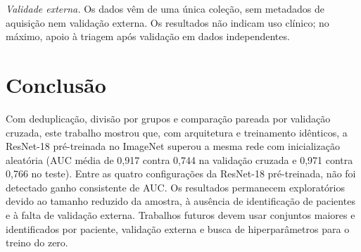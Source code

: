 \documentclass[conference]{IEEEtran}
\begin{document}
\textit{Validade externa.} Os dados vêm de uma única coleção, sem metadados de aquisição nem validação externa. Os resultados não indicam uso clínico; no máximo, apoio à triagem após validação em dados independentes.

\section{Conclusão}

Com deduplicação, divisão por grupos e comparação pareada por validação cruzada, este trabalho mostrou que, com arquitetura e treinamento idênticos, a ResNet-18 pré-treinada no ImageNet superou a mesma rede com inicialização aleatória (AUC média de 0,917 contra 0,744 na validação cruzada e 0,971 contra 0,766 no teste). Entre as quatro configurações da ResNet-18 pré-treinada, não foi detectado ganho consistente de AUC. Os resultados permanecem exploratórios devido ao tamanho reduzido da amostra, à ausência de identificação de pacientes e à falta de validação externa. Trabalhos futuros devem usar conjuntos maiores e identificados por paciente, validação externa e busca de hiperparâmetros para o treino do zero.
\end{document}
